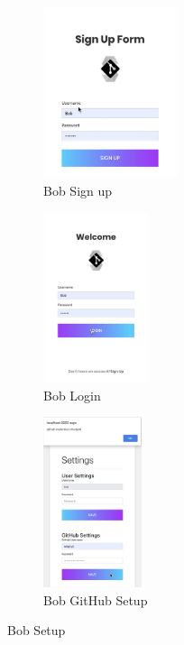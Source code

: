 \documentclass[12pt]{article}
\renewcommand{\_}{\kern-1.5pt\textunderscore\kern-1.5pt}
\begin{document}



\begin{figure}[H]
	\centering
	\begin{subfigure}[b]{.32\textwidth}
		\centering
		\includegraphics[height=5cm]{graphs/18. bob_sign_up}
		\caption{Bob Sign up}
	\end{subfigure}
	\begin{subfigure}[b]{.32\textwidth}
		\centering
		\includegraphics[height=5cm]{graphs/19. bob_login}
		\caption{Bob Login}
	\end{subfigure}
	\begin{subfigure}[b]{.32\textwidth}
		\centering
		\includegraphics[height=5cm]{graphs/20. bob_gitub_setup}
		\caption{Bob GitHub Setup}
	\end{subfigure}
	\caption{Bob Setup}
\end{figure}
\end{document}
